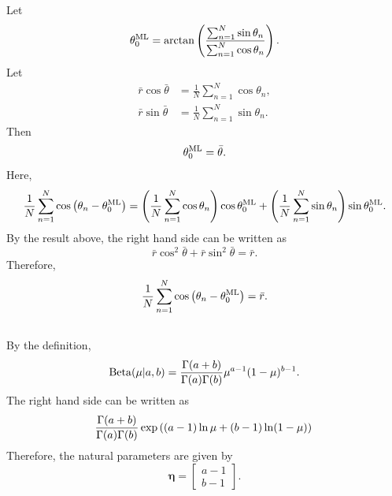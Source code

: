 \subsection{}
\label{2.55}
Let
%
\begin{equation}
\theta_0 ^ {\rm ML}
=
\arctan 
\left(
	\frac
	{\sum_{n = 1}^{N} \sin \theta_n}
	{\sum_{n = 1}^{N} \cos \theta_n}
\right).
\end{equation}
%
Let
%
\begin{equation}
\begin{aligned}
\bar{r} 
\cos \bar{\theta}
&=
\frac{1}{N}
\sum_{n = 1}^{N}
\cos \theta_n, 
\\
\bar{r} 
\sin \bar{\theta}
&=
\frac{1}{N}
\sum_{n = 1}^{N}
\sin \theta_n.
\end{aligned}
\end{equation}
%
Then
%
\begin{equation}
\theta_0 ^ {\rm ML}
=
\bar{\theta}.
\end{equation}
%
Here,
%
\begin{equation}
\frac{1}{N}
\sum_{n = 1}^{N}
\cos
\left(
	\theta_n
	-
	\theta_0 ^ {\rm ML}
\right)
=
\left(
	\frac{1}{N}
	\sum_{n = 1}^{N}
	\cos \theta_n
\right)
\cos \theta_0 ^ {\rm ML}
+
\left(
	\frac{1}{N}
	\sum_{n = 1}^{N}
	\sin \theta_n
\right)
\sin \theta_0 ^ {\rm ML}.
\end{equation}
%
By the result above, the right hand side can be written as
%
\begin{equation}
\bar{r} 
\cos ^ 2 \bar{\theta}
+
\bar{r} 
\sin ^ 2 \bar{\theta}
=
\bar{r}.
\end{equation}
%
Therefore,
%
\begin{equation}
\frac{1}{N}
\sum_{n = 1}^{N}
\cos
\left(
	\theta_n
	-
	\theta_0 ^ {\rm ML}
\right)
=
\bar{r}.
\end{equation}
%


\subsection{}
\label{2.56}
By the definition,
%
\begin{equation}
{\rm Beta}(\mu | a, b)
=
\frac{\Gamma(a + b)}{\Gamma(a) \Gamma(b)}
\mu ^ {a - 1}
(1 - \mu) ^ {b - 1}.
\end{equation}
%
The right hand side can be written as
%
\begin{equation}
\frac{\Gamma(a + b)}{\Gamma(a) \Gamma(b)}
\exp
\left(
	(a - 1) \ln \mu
	+
	(b - 1) \ln (1 - \mu)
\right) \\
\end{equation}
%
Therefore, the natural parameters are given by
\[
\bm{\eta}
=
\begin{bmatrix}
a - 1  
\\
b - 1 
\end{bmatrix}
.
\]

